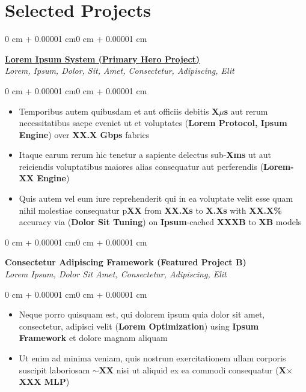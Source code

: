 \documentclass[10pt, letterpaper]{article}
\newenvironment{onecolentry}{
\begin{adjustwidth}{0 cm + 0.00001 cm}{0 cm + 0.00001 cm}
    }{
\end{adjustwidth}
}
\begin{document}
    \section{Selected Projects}
    \begin{onecolentry}
        \hspace*{0.1cm} \href{https://github.com/user/project}{\textbf{Lorem Ipsum System (Primary Hero Project)}} \\
        \hspace*{0.1cm} \textit{Lorem, Ipsum, Dolor, Sit, Amet, Consectetur, Adipiscing, Elit}
    \end{onecolentry}
    \vspace{0.02 cm}
    \begin{onecolentry}
        \begin{itemize}[leftmargin=0.4cm + 10pt, labelsep=5pt]
            \item Temporibus autem quibusdam et aut officiis debitis \textbf{X$\mu$s} aut rerum necessitatibus saepe eveniet ut et voluptates (\textbf{Lorem Protocol, Ipsum Engine}) over \textbf{XX.X Gbps} fabrics
            \item Itaque earum rerum hic tenetur a sapiente delectus sub-\textbf{Xms} ut aut reiciendis voluptatibus maiores alias consequatur aut perferendis (\textbf{Lorem-XX Engine})
            \item Quis autem vel eum iure reprehenderit qui in ea voluptate velit esse quam nihil molestiae consequatur p\textbf{XX} from \textbf{XX.Xs} to \textbf{X.Xs} with \textbf{XX.X\%} accuracy via (\textbf{Dolor Sit Tuning}) on \textbf{Ipsum}-cached \textbf{XXXB} to \textbf{XB} models
        \end{itemize}
    \end{onecolentry}

    \vspace{0.03 cm}
    \begin{onecolentry}
        \hspace*{0.1cm} \textbf{Consectetur Adipiscing Framework (Featured Project B)} \\
        \hspace*{0.1cm} \textit{Lorem Ipsum, Dolor Sit Amet, Consectetur, Adipiscing, Elit}
    \end{onecolentry}
    \vspace{0.02 cm}
    \begin{onecolentry}
        \begin{itemize}[leftmargin=0.4cm + 10pt, labelsep=5pt]
            \item Neque porro quisquam est, qui dolorem ipsum quia dolor sit amet, consectetur, adipisci velit (\textbf{Lorem Optimization}) using \textbf{Ipsum Framework} et dolore magnam aliquam
            \item Ut enim ad minima veniam, quis nostrum exercitationem ullam corporis suscipit laboriosam \textbf{$\sim$XX} nisi ut aliquid ex ea commodi consequatur (\textbf{X$\times$XXX MLP})
        \end{itemize}
    \end{onecolentry}
\end{document}
